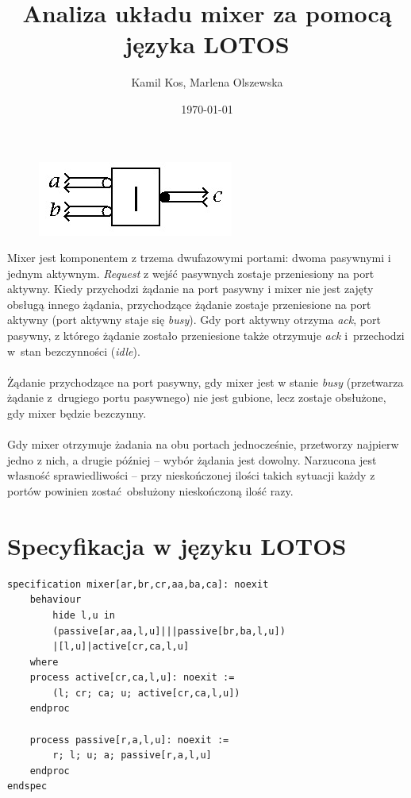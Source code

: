 \documentclass[12pt, a4paper, notitlepage]{article}
\title{Analiza układu mixer za pomocą języka LOTOS}
\author{Kamil Kos, Marlena Olszewska}
\date{\today}
\begin{document}
{\let\newpage\relax\maketitle}

\thispagestyle{empty}
\begin{figure}[!htb]
	\centering
\includegraphics[scale=0.7]{cd}
\end{figure}

Mixer jest komponentem z trzema dwufazowymi portami: dwoma pasywnymi i jednym aktywnym. \textit{Request} z wejść pasywnych zostaje przeniesiony na port aktywny. Kiedy przychodzi żądanie na port pasywny i mixer nie jest zajęty obsługą innego żądania, przychodzące żądanie zostaje przeniesione na port aktywny (port aktywny staje się \textit{busy}). Gdy port aktywny otrzyma \textit{ack}, port pasywny, z którego żądanie zostało przeniesione także otrzymuje \textit{ack} i~przechodzi w~stan bezczynności (\textit{idle}).
\\\\
Żądanie przychodzące na port pasywny, gdy mixer jest w stanie \textit{busy} (przetwarza żądanie z~drugiego portu pasywnego) nie jest gubione, lecz zostaje obsłużone, gdy mixer będzie bezczynny.
\\\\
Gdy mixer otrzymuje żadania na obu portach jednocześnie, przetworzy najpierw jedno z nich, a drugie później -- wybór żądania jest dowolny. Narzucona jest własność sprawiedliwości -- przy nieskończonej ilości takich sytuacji każdy z portów powinien zostać obsłużony nieskończoną ilość razy.

\section*{Specyfikacja w języku LOTOS}
\begin{lstlisting}
specification mixer[ar,br,cr,aa,ba,ca]: noexit
	behaviour
		hide l,u in
		(passive[ar,aa,l,u]|||passive[br,ba,l,u])
		|[l,u]|active[cr,ca,l,u]
	where
	process active[cr,ca,l,u]: noexit :=
		(l; cr; ca; u; active[cr,ca,l,u])
	endproc
	
	process passive[r,a,l,u]: noexit :=
		r; l; u; a; passive[r,a,l,u]
	endproc
endspec

\end{lstlisting}
\end{document}
